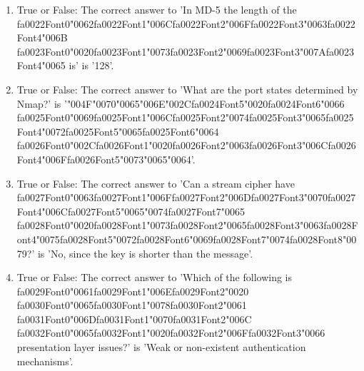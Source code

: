 \documentclass[12pt]{article}
\begin{document}
\begin{enumerate}[label=\arabic*.]
\item True or False: The correct answer to 'In MD-5 the length of the {\csname fa0022Font0\endcsname\char"0062}{\csname fa0022Font1\endcsname\char"006C}{\csname fa0022Font2\endcsname\char"006F}{\csname fa0022Font3\endcsname\char"0063}{\csname fa0022Font4\endcsname\char"006B} {\csname fa0023Font0\endcsname\char"0020}{\csname fa0023Font1\endcsname\char"0073}{\csname fa0023Font2\endcsname\char"0069}{\csname fa0023Font3\endcsname\char"007A}{\csname fa0023Font4\endcsname\char"0065} is' is '128'.
\item True or False: The correct answer to 'What are the port states determined by Nmap?' is '{\char"004F}{\char"0070}{\char"0065}{\char"006E}{\char"002C}{\csname fa0024Font5\endcsname\char"0020}{\csname fa0024Font6\endcsname\char"0066} {\csname fa0025Font0\endcsname\char"0069}{\csname fa0025Font1\endcsname\char"006C}{\csname fa0025Font2\endcsname\char"0074}{\csname fa0025Font3\endcsname\char"0065}{\csname fa0025Font4\endcsname\char"0072}{\csname fa0025Font5\endcsname\char"0065}{\csname fa0025Font6\endcsname\char"0064} {\csname fa0026Font0\endcsname\char"002C}{\csname fa0026Font1\endcsname\char"0020}{\csname fa0026Font2\endcsname\char"0063}{\csname fa0026Font3\endcsname\char"006C}{\csname fa0026Font4\endcsname\char"006F}{\csname fa0026Font5\endcsname\char"0073}{\char"0065}{\char"0064}'.
\item True or False: The correct answer to 'Can a stream cipher have {\csname fa0027Font0\endcsname\char"0063}{\csname fa0027Font1\endcsname\char"006F}{\csname fa0027Font2\endcsname\char"006D}{\csname fa0027Font3\endcsname\char"0070}{\csname fa0027Font4\endcsname\char"006C}{\csname fa0027Font5\endcsname\char"0065}{\char"0074}{\csname fa0027Font7\endcsname\char"0065} {\csname fa0028Font0\endcsname\char"0020}{\csname fa0028Font1\endcsname\char"0073}{\csname fa0028Font2\endcsname\char"0065}{\csname fa0028Font3\endcsname\char"0063}{\csname fa0028Font4\endcsname\char"0075}{\csname fa0028Font5\endcsname\char"0072}{\csname fa0028Font6\endcsname\char"0069}{\csname fa0028Font7\endcsname\char"0074}{\csname fa0028Font8\endcsname\char"0079}?' is 'No, since the key is shorter than the message'.
\item True or False: The correct answer to 'Which of the following is {\csname fa0029Font0\endcsname\char"0061}{\csname fa0029Font1\endcsname\char"006E}{\csname fa0029Font2\endcsname\char"0020} {\csname fa0030Font0\endcsname\char"0065}{\csname fa0030Font1\endcsname\char"0078}{\csname fa0030Font2\endcsname\char"0061} {\csname fa0031Font0\endcsname\char"006D}{\csname fa0031Font1\endcsname\char"0070}{\csname fa0031Font2\endcsname\char"006C} {\csname fa0032Font0\endcsname\char"0065}{\csname fa0032Font1\endcsname\char"0020}{\csname fa0032Font2\endcsname\char"006F}{\csname fa0032Font3\endcsname\char"0066} presentation layer issues?' is 'Weak or non-existent authentication mechanisms'.

\end{enumerate}
\end{document}
